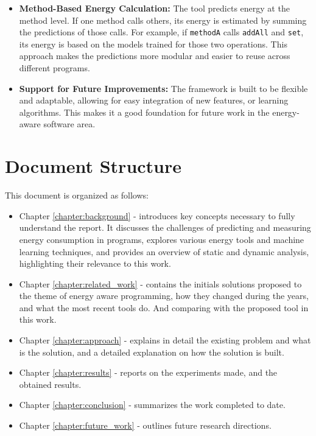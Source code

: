 {\begin{itemize}
    \item \textbf{Method-Based Energy Calculation:} The tool predicts energy at the method level. If one method calls others, its energy is estimated by summing the predictions of those calls. For example, if \texttt{methodA} calls \texttt{addAll} and \texttt{set}, its energy is based on the models trained for those two operations. This approach makes the predictions more modular and easier to reuse across different programs.

    \item \textbf{Support for Future Improvements:} The framework is built to be flexible and adaptable, allowing for easy integration of new features, or learning algorithms. This makes it a good foundation for future work in the energy-aware software area.
\end{itemize}
}



\section{Document Structure}

This document is organized as follows:

\begin{itemize}
\item Chapter \ref{chapter:background} - introduces key concepts necessary to fully understand the report. It discusses the challenges of predicting and measuring energy consumption in programs, explores various energy tools and machine learning techniques, and provides an overview of static and dynamic analysis, highlighting their relevance to this work.

\item Chapter \ref{chapter:related_work} - contains the initials solutions proposed to the theme of energy aware programming, how they changed during the years, and what the most recent tools do. And comparing with the proposed tool in this work.

\item Chapter \ref{chapter:approach} - explains in detail the existing problem and what is the solution, and a detailed explanation on how the solution is built.

\item Chapter \ref{chapter:results} - reports on the experiments made, and the obtained results.

\item Chapter \ref{chapter:conclusion} - summarizes the work completed to date.

\item Chapter \ref{chapter:future_work} - outlines future research directions.

\end{itemize}